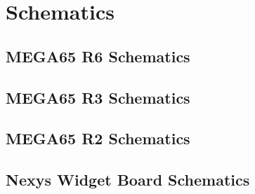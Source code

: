 \chapter{Schematics}
\section{MEGA65 R6 Schematics}



\section{MEGA65 R3 Schematics}

\section{MEGA65 R2 Schematics}

\section{Nexys Widget Board Schematics}
\label{sec:nexyswidgetschematics}



